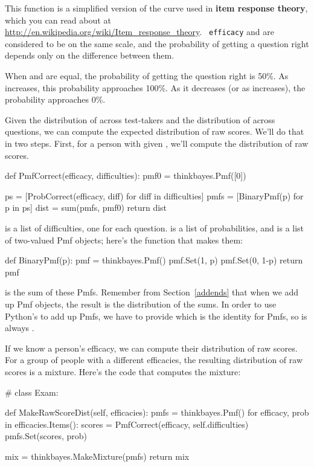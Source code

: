 \documentclass[12pt]{book}
\theoremstyle{exercise}
\begin{document}
This function is a simplified version of the curve used in {\bf item
response theory}, which you can read about at
\url{http://en.wikipedia.org/wiki/Item_response_theory}.  {\tt
  efficacy} and  are considered to be on the same
scale, and the probability of getting a question right depends only on
the difference between them.

When  and  are equal, the
probability of getting the question right is 50\%.  As
 increases, this probability approaches 100\%.
As it decreases (or as  increases), the
probability approaches 0\%.

Given the distribution of  across test-takers
and the distribution of  across questions, we
can compute the expected distribution of raw scores.  We'll do that
in two steps.  First, for a person with given ,
we'll compute the distribution of raw scores.

\begin{code}
def PmfCorrect(efficacy, difficulties):
    pmf0 = thinkbayes.Pmf([0])

    ps = [ProbCorrect(efficacy, diff) for diff in difficulties]
    pmfs = [BinaryPmf(p) for p in ps]
    dist = sum(pmfs, pmf0)
    return dist
\end{code}

 is a list of difficulties, one for each question.
 is a list of probabilities, and  is a list of
two-valued Pmf objects; here's the function that makes them:

\begin{code}
def BinaryPmf(p):
    pmf = thinkbayes.Pmf()
    pmf.Set(1, p)
    pmf.Set(0, 1-p)
    return pmf
\end{code}

 is the sum of these Pmfs.  Remember from Section~\ref{addends}
that when we add up Pmf objects, the result is the distribution
of the sums.  In order to use Python's  to add up Pmfs,
we have to provide  which is the identity for Pmfs,
so  is always .

If we know a person's efficacy, we can compute their distribution
of raw scores.  For a group of people with a different efficacies, the
resulting distribution of raw scores is a mixture.  Here's the code
that computes the mixture:

\begin{code}
# class Exam:

    def MakeRawScoreDist(self, efficacies):
        pmfs = thinkbayes.Pmf()
        for efficacy, prob in efficacies.Items():
            scores = PmfCorrect(efficacy, self.difficulties)
            pmfs.Set(scores, prob)

        mix = thinkbayes.MakeMixture(pmfs)
        return mix
\end{code}
\end{document}
